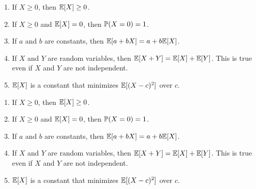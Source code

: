 \begin{note}
  \begin{field}
    \begin{thm}\leavevmode
    \begin{enumerate}
      \item If $X \geq 0$, then $\E[X] \geq 0$.
      \item If $X\geq 0$ and $\E[X] = 0$, then $\P(X = 0) = 1$.
      \item If $a$ and $b$ are constants, then $\E[a + bX] = a + b\E[X]$.
      \item If $X$ and $Y$ are random variables, then $\E[X + Y] = \E[X] + \E[Y]$. This is true even if $X$ and $Y$ are not independent.
      \item $\E[X]$ is a constant that minimizes $\E[(X - c)^2]$ over $c$.
    \end{enumerate}
    \end{thm}
  \end{field}
  \begin{field}
    \begin{thm}\leavevmode
    \begin{enumerate}
      \item If $X \geq 0$, then $\E[X] \geq 0$.
      \item If $X\geq 0$ and $\E[X] = 0$, then $\P(X = 0) = 1$.
      \item If $a$ and $b$ are constants, then $\E[a + bX] = a + b\E[X]$.
      \item If $X$ and $Y$ are random variables, then $\E[X + Y] = \E[X] + \E[Y]$. This is true even if $X$ and $Y$ are not independent.
      \item $\E[X]$ is a constant that minimizes $\E[(X - c)^2]$ over $c$.
    \end{enumerate}
    \end{thm}
  \end{field}
  \xplain{}%
\end{note}


